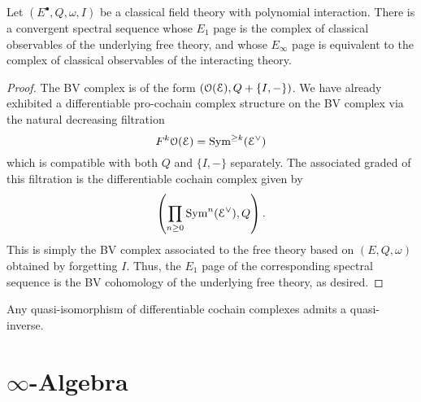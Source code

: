 \documentclass[10pt, oneside]{article}
\begin{document}
\begin{lemma} \label{free_int_ss_lemma}
Let $(E^\bullet, Q, \omega, I)$ be a classical field theory with polynomial interaction.  
There is a convergent spectral sequence whose $E_1$ page is the complex of classical observables of the underlying free theory, and whose $E_\infty$ page is equivalent to the complex of classical observables of the interacting theory.
\end{lemma}
\begin{proof}
The BV complex is of the form $\left(\mathcal O(\mathcal E), Q + \{I,-\}\right)$.
We have already exhibited  a differentiable pro-cochain complex structure on the BV complex via the 
natural decreasing filtration 
\[
F^k \mathcal O (\mathcal E) = {\rm Sym}^{\geq k} (\mathcal E^\vee)
\]
which is compatible with both $Q$ and $\{I,-\}$ separately.
The associated graded of this filtration is the differentiable cochain complex given by
\[
\left(\prod_{n \geq 0} {\rm Sym}^n (\mathcal E^\vee) , Q \right) .
\]
This is simply the BV complex associated to the free theory based on $(E, Q, \omega)$ obtained by forgetting $I$. 
Thus, the $E_1$ page of the corresponding spectral sequence is the BV cohomology of the underlying free theory, as desired. 
 
\end{proof}

\begin{lemma} \label{invert_quis_lemma}
Any quasi-isomorphism of differentiable cochain complexes admits a quasi-inverse.
\end{lemma}

\section{$\infty$-Algebra}
\label{appx:infinity}


\pagestyle{bib}
\printbibliography
\end{document}
